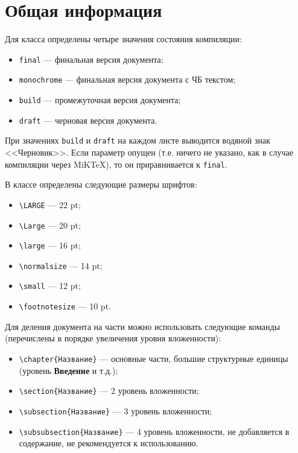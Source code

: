 \chapter{Общая информация}

Для класса определены четыре значения состояния компиляции:
\begin{itemize}
    \item \lstinline:final: --- финальная версия документа;
    \item \lstinline:monochrome: --- финальная версия документа с ЧБ текстом;
    \item \lstinline:build: --- промежуточная версия документа;
    \item \lstinline:draft: --- черновая версия документа.
\end{itemize}

При значениях \lstinline:build: и \lstinline:draft: на каждом листе выводится водяной знак
<<Черновик>>. Если параметр опущен (т.е. ничего не указано, как в случае
компиляции через MiKTeX), то он приравнивается к \lstinline:final:.

В классе определены следующие размеры шрифтов:
\begin{itemize}
    \item \lstinline:\LARGE: --- 22 pt;
    \item \lstinline:\Large: --- 20 pt;
    \item \lstinline:\large: --- 16 pt;
    \item \lstinline:\normalsize: --- 14 pt;
    \item \lstinline:\small: --- 12 pt;
    \item \lstinline:\footnotesize: --- 10 pt.
\end{itemize}

Для деления документа на части можно использовать следующие команды (перечислены
в порядке увеличения уровня вложенности):

\begin{itemize}
    \item \lstinline:\chapter{Название}: --- основные части, большие структурные единицы
    (уровень \textbf{Введение} и т.д.);
    \item \lstinline:\section{Название}: --- 2 уровень вложенности;
    \item \lstinline:\subsection{Название}: --- 3 уровень вложенности;
    \item \lstinline:\subsubsection{Название}: --- 4 уровень вложенности, не добавляется в
    содержание, не рекомендуется к использованию.
\end{itemize}

